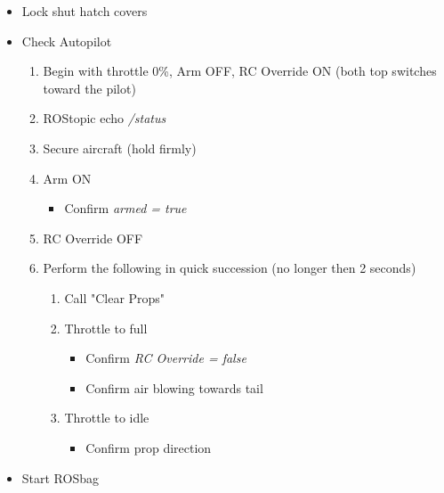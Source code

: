 \documentclass[]{auvsi_doc}
\begin{document}
\begin{itemize}
\begin{itemize}
	\end{itemize}
	\item Lock shut hatch covers
	\item Check Autopilot
	\begin{enumerate}
		\item Begin with throttle 0\%, Arm OFF, RC Override ON (both top switches toward the pilot)
		\item ROStopic echo \textit{/status}
		\item Secure aircraft (hold firmly)
		\item Arm ON
		\begin{itemize}
			\item Confirm \textit{armed = true}
		\end{itemize}
		\item RC Override OFF
		\item Perform the following in quick succession (no longer then 2 seconds)
		\begin{enumerate}
			\item Call "Clear Props"
			\item Throttle to full
			\begin{itemize}
				\item Confirm \textit{RC Override = false}
				\item Confirm air blowing towards tail
			\end{itemize}
			\item Throttle to idle
			\begin{itemize}
				\item Confirm prop direction
			\end{itemize}
		\end{enumerate}
	\end{enumerate}
        \item Start ROSbag
\end{itemize}

\hrulefill
\end{document}

